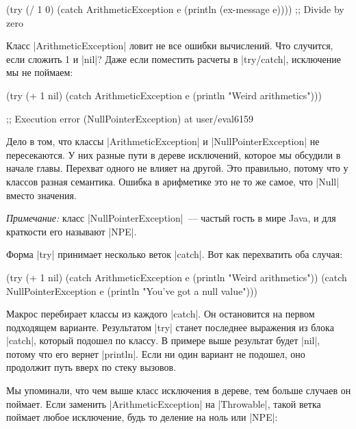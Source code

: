 \begin{english}
  \begin{clojure}
(try
  (/ 1 0)
  (catch ArithmeticException e
    (println (ex-message e))))
;; Divide by zero
  \end{clojure}
\end{english}

Класс \spverb|ArithmeticException| ловит не все ошибки вычислений. Что случится,
если сложить 1 и \spverb|nil|? Даже если поместить расчеты в \spverb|try/catch|,
исключение мы не поймаем:

\begin{english}
  \begin{clojure}
(try
  (+ 1 nil)
  (catch ArithmeticException e
    (println "Weird arithmetics")))

;; Execution error (NullPointerException) at user/eval6159
  \end{clojure}
\end{english}

Дело в том, что классы \spverb|ArithmeticException| и
\spverb|NullPointerException| не пересекаются. У них разные пути в дереве
исключений, которое мы обсудили в начале главы. Перехват одного не влияет на
другой. Это правильно, потому что у классов разная семантика. Ошибка в
арифметике это не то же самое, что \spverb|Null| вместо значения.

\emph{Примечание:} класс \spverb|NullPointerException|~--- частый гость в мире
Java, и для краткости его называют \spverb|NPE|.

Форма \spverb|try| принимает несколько веток \spverb|catch|. Вот как перехватить
оба случая:

\begin{english}
  \begin{clojure}
(try
  (+ 1 nil)
  (catch ArithmeticException e
    (println "Weird arithmetics"))
  (catch NullPointerException e
    (println "You've got a null value")))
  \end{clojure}
\end{english}

Макрос перебирает классы из каждого \spverb|catch|. Он остановится на первом
подходящем варианте. Результатом \spverb|try| станет последнее выражения из
блока \spverb|catch|, который подошел по классу. В примере выше результат будет
\spverb|nil|, потому что его вернет \spverb|println|. Если ни один вариант не
подошел, оно продолжит путь вверх по стеку вызовов.

Мы упоминали, что чем выше класс исключения в дереве, тем больше случаев он
поймает. Если заменить \spverb|ArithmeticException| на \spverb|Throwable|, такой
ветка поймает любое исключение, будь то деление на ноль или \spverb|NPE|:

